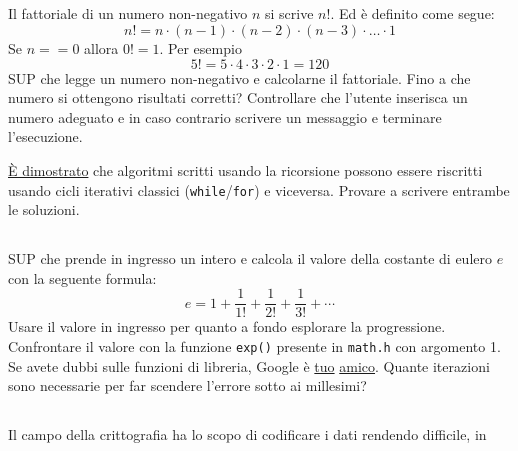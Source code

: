 \documentclass{article}
\begin{document}
\subsection{}
Il fattoriale di un numero non-negativo $n$ si scrive $n!$. Ed è definito come segue:
$$n! = n \cdot (n - 1) \cdot (n - 2) \cdot (n - 3) \cdot \ldots \cdot 1$$
Se $n==0$ allora $0! = 1$.
Per esempio $$5! = 5 \cdot 4 \cdot 3 \cdot 2 \cdot 1 = 120$$
SUP che legge un numero non-negativo e calcolarne il fattoriale. Fino a che numero si ottengono risultati corretti? Controllare che l'utente inserisca un numero adeguato e in caso contrario scrivere un messaggio e terminare l'esecuzione. 
\begin{info} 
	\href{https://en.wikipedia.org/wiki/Recursion_(computer_science)#Recursion_versus_iteration}{È dimostrato} che algoritmi scritti usando la ricorsione possono essere riscritti usando cicli iterativi classici (\texttt{while}/\texttt{for}) e viceversa. Provare a scrivere entrambe le soluzioni.
\end{info}


\subsection{}
SUP che prende in ingresso un intero e calcola il valore della costante di eulero $e$ con la seguente formula:
$$e = 1 + \frac{1}{1!} + \frac{1}{2!} + \frac{1}{3!} + \cdots$$
Usare il valore in ingresso per quanto a fondo esplorare la progressione. Confrontare il valore con la funzione \texttt{exp()} presente in \texttt{math.h} con argomento 1. Se avete dubbi sulle funzioni di libreria, Google è \href{http://www.cplusplus.com/reference/cmath/exp/}{tuo} \href{https://www.geeksforgeeks.org/exp-function-cpp/}{amico}. Quante iterazioni sono necessarie per far scendere l'errore sotto ai millesimi?

\subsection{}
Il campo della crittografia ha lo scopo di codificare i dati rendendo difficile, in
\end{document}
